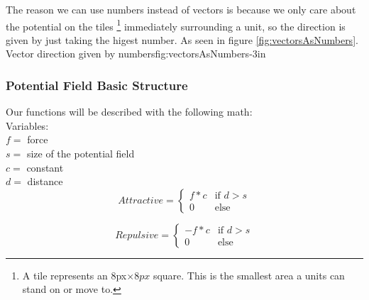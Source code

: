 		The reason we can use numbers instead of vectors is because we only care about the potential on the tiles \footnote{A tile represents an 8px$\times8px$ square. This is the smallest area a units can stand on or move to.} immediately surrounding a unit, so the direction is given by just taking the higest number. As seen in figure \ref{fig:vectorsAsNumbers}.
		{Vector direction given by numbers}{fig:vectorsAsNumbers}{-3in}
		\\
		
		\subsubsection{Potential Field Basic Structure}
		Our functions will be described with the following math: \\
		
		Variables:\\
		$f =$ force\\
		$s =$ size of the potential field\\
		$c =$ constant\\
		$d =$ distance\\
		
		\begin{displaymath}
			Attractive = \begin{cases}
					f * c & \text{if $d > s$}\\
					0 & \text{else}
				\end{cases}		
		\end{displaymath}
			
		\begin{displaymath}
			Repulsive = \begin{cases}
					- f * c & \text{if $d > s$}\\
					0 & \text{else}
				\end{cases}		
		\end{displaymath}
		
		
